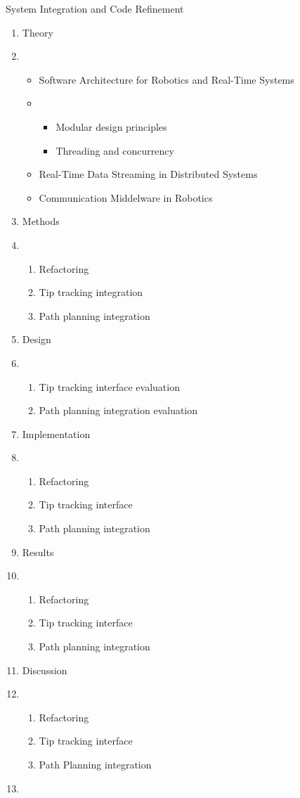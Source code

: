 System Integration and Code Refinement
\begin{enumerate}
    \item Theory
    \item \begin{itemize}
        \item Software Architecture for Robotics and Real-Time Systems
        \item \begin{itemize}
            \item Modular design principles
            \item Threading and concurrency
        \end{itemize}
        \item Real-Time Data Streaming in Distributed Systems
        \item Communication Middelware in Robotics
    \end{itemize}
    \item Methods
    \item \begin{enumerate}
        \item Refactoring
        \item Tip tracking integration
        \item Path planning integration
    \end{enumerate}
    \item Design
    \item \begin{enumerate}
        \item Tip tracking interface evaluation
        \item Path planning integration evaluation
    \end{enumerate}
    \item Implementation
    \item \begin{enumerate}
        \item Refactoring
        \item Tip tracking interface
        \item Path planning integration
    \end{enumerate}
    \item Results
    \item \begin{enumerate}
        \item Refactoring
        \item Tip tracking interface
        \item Path planning integration
    \end{enumerate}
    \item Discussion
    \item \begin{enumerate}
        \item Refactoring
        \item Tip tracking interface
        \item Path Planning integration
    \end{enumerate}
\item 
\end{enumerate}

